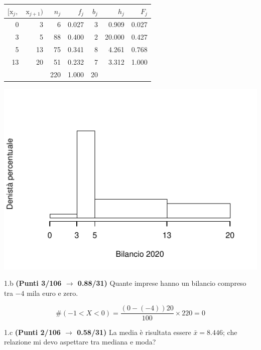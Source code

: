 \documentclass[
  11pt,
]{book}
\theoremstyle{mytheoremstyle}
\theoremstyle{mydefstyle}
\newenvironment{sol}
  {
  \begin{tcolorbox}[enhanced,breakable,arc=0.1mm,boxrule=1pt,colback=white,colframe=iblue,
  title=\bf \fontfamily{lmss}\selectfont \hspace{.5 cm} Soluzione,drop fuzzy shadow]

}{
\end{tcolorbox}
  }
\begin{document}
\begin{sol}

\begin{table}[H]
\centering
\begin{tabular}{rrrrrrr}
\toprule
$[\text{x}_j,$ & $\text{x}_{j+1})$ & $n_j$ & $f_j$ & $b_j$ & $h_j$ & $F_j$\\
\midrule
0 & 3 & 6 & 0.027 & 3 & 0.909 & 0.027\\
3 & 5 & 88 & 0.400 & 2 & 20.000 & 0.427\\
5 & 13 & 75 & 0.341 & 8 & 4.261 & 0.768\\
13 & 20 & 51 & 0.232 & 7 & 3.312 & 1.000\\
 &  & 220 & 1.000 & 20 &  & \\
\bottomrule
\end{tabular}
\end{table}

\begin{center}\includegraphics{Esami_passati_con_soluzioni_files/figure-latex/2022-80-1} \end{center}

\end{sol}

1.b \textbf{(Punti 3/106 \(\rightarrow\) 0.88/31)} Quante imprese hanno un bilancio compreso tra \(-4\) mila
euro e zero.

\begin{sol}
\[\#(-1<X<0)=\frac{(0-(-4))20}{100}\times 220=0\]

\end{sol}

1.c \textbf{(Punti 2/106 \(\rightarrow\) 0.58/31)} La media è risultata essere \(\bar x=8.446\); che
relazione mi devo aspettare tra mediana e moda?
\end{document}
